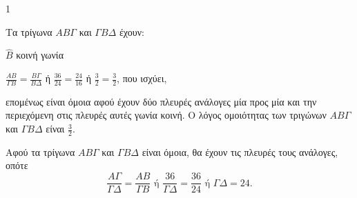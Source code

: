 \begin{ylh}{1}
    \item [Ύλη από εικόνα]
\end{ylh}
\begin{alist}
\item Τα τρίγωνα $ABΓ$ και $ΓBΔ$ έχουν:
  \begin{rlist}
    \item $\hat{B}$ κοινή γωνία
    \item $\frac{AB}{ΓB} = \frac{BΓ}{BΔ}$ ή $\frac{36}{24} = \frac{24}{16}$ ή $\frac{3}{2} = \frac{3}{2}$, που ισχύει,
  \end{rlist}
  επομένως είναι όμοια αφού έχουν δύο πλευρές ανάλογες μία προς μία και την περιεχόμενη
  στις πλευρές αυτές γωνία κοινή. Ο λόγος ομοιότητας των τριγώνων $ABΓ$ και $ΓBΔ$ είναι $\frac{3}{2}$.
\item Αφού τα τρίγωνα $ABΓ$ και $ΓBΔ$ είναι όμοια, θα έχουν τις πλευρές τους ανάλογες, οπότε
  \[ \frac{AΓ}{ΓΔ} = \frac{AB}{ΓB} \text{ ή } \frac{36}{ΓΔ} = \frac{36}{24} \text{ ή } ΓΔ = 24. \]
\end{alist}